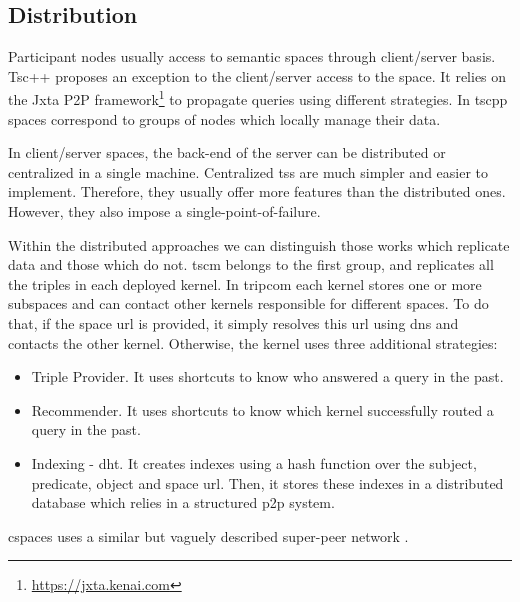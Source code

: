 



\subsection{Distribution} %
\label{sec:soa_tsc_distribution}

Participant nodes usually access to semantic spaces through client/server basis.
Tsc++\citep{krummenacher_open_2009,blunder_distributed_2009} proposes an exception to the client/server access to the space.
It relies on the Jxta P2P framework\footnote{\url{https://jxta.kenai.com}} to propagate queries using different strategies.
In \acs{tscpp} spaces correspond to groups of nodes which locally manage their data.


In client/server spaces, the back-end of the server can be distributed or centralized in a single machine.
Centralized \aclp{ts} are much simpler and easier to implement.
Therefore, they usually offer more features than the distributed ones.
However, they also impose a single-point-of-failure.


Within the distributed approaches we can distinguish those works which replicate data and those which do not.
\acs{tscm} belongs to the first group, and replicates all the triples in each deployed kernel.
In \ac{tripcom} each kernel stores one or more subspaces and can contact other kernels responsible for different spaces.
To do that, if the space \ac{url} is provided, it simply resolves this \ac{url} using \ac{dns} and contacts the other kernel.
Otherwise, the kernel uses three additional strategies:
\begin{itemize}
  \item Triple Provider.
	It uses shortcuts to know who answered a query in the past.
  \item Recommender.
	It uses shortcuts to know which kernel successfully routed a query in the past.
  \item Indexing - \ac{dht}.
	It creates indexes using a hash function over the subject, predicate, object and space \ac{url}.
	Then, it stores these indexes in a distributed database which relies in a structured \ac{p2p} system. %
\end{itemize}
\ac{cspaces} uses a similar but vaguely described super-peer network \citep{martinrecuerda_application_2006}.



